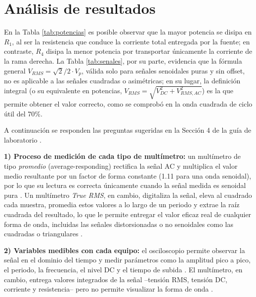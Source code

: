 \documentclass[journal, a4paper]{IEEEtran}
\begin{document}
\section{Análisis de resultados}

En la Tabla \ref{tab:potencias} es posible observar que la mayor potencia se disipa en $R_1$, al ser la resistencia que conduce la corriente total entregada por la fuente; en contraste, $R_4$ disipa la menor potencia por transportar únicamente la corriente de la rama derecha. La Tabla \ref{tab:senales}, por su parte, evidencia que la fórmula general $V_{RMS}=\sqrt{2}/2 \cdot V_p$, válida solo para señales senoidales puras y sin offset, no es aplicable a las señales cuadradas o asimétricas; en su lugar, la definición integral (o su equivalente en potencias, $V_{RMS}=\sqrt{V_{DC}^2+V_{RMS,AC}^2}$) es la que permite obtener el valor correcto, como se comprobó en la onda cuadrada de ciclo útil del 70\%.

A continuación se responden las preguntas sugeridas en la Sección 4 de la guía de laboratorio \cite{guia_practica0}.

\textbf{1) Proceso de medición de cada tipo de multímetro:} un multímetro de tipo \emph{promedio} (average-responding) rectifica la señal AC y multiplica el valor medio resultante por un factor de forma constante (1.11 para una onda senoidal), por lo que su lectura es correcta únicamente cuando la señal medida es senoidal pura \cite{fluke_truerms,keysight_truerms}. Un multímetro \emph{True RMS}, en cambio, digitaliza la señal, eleva al cuadrado cada muestra, promedia estos valores a lo largo de un periodo y extrae la raíz cuadrada del resultado, lo que le permite entregar el valor eficaz real de cualquier forma de onda, incluidas las señales distorsionadas o no senoidales como las cuadradas o triangulares \cite{fluke_truerms}.

\textbf{2) Variables medibles con cada equipo:} el osciloscopio permite observar la señal en el dominio del tiempo y medir parámetros como la amplitud pico a pico, el periodo, la frecuencia, el nivel DC y el tiempo de subida \cite{sedra2020}. El multímetro, en cambio, entrega valores integrados de la señal --tensión RMS, tensión DC, corriente y resistencia-- pero no permite visualizar la forma de onda \cite{sedra2020}.
\end{document}
